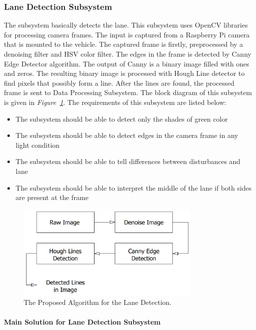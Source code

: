 \documentclass[a4paper,12pt]{article}
\begin{document}
	\subsubsection{Lane Detection Subsystem}
	The subsystem basically detects the lane. This subsystem uses OpenCV libraries for processing camera frames. The input is captured from a Raspberry Pi camera that is mounted to the vehicle. The captured frame is firstly, preprocessed by a denoising filter and HSV color filter. The edges in the frame is detected by Canny Edge Detector algorithm. The output of Canny is a binary image filled with ones and zeros. The resulting binary image is processed with Hough Line detector to find pixels that possibly form a line. After the lines are found, the processed frame is sent to Data Processing Subsystem. The block diagram of this subsystem is given in \textit{Figure~\ref{fig:lane_detection_subsystem}}. The requirements of this subsystem are listed below:
	\begin{itemize}
		\item The subsystem should be able to detect only the shades of green color
		\item The subsystem should be able to detect edges in the camera frame in any light condition
		\item The subsystem should be able to tell differences between disturbances and lane
		\item The subsystem should be able to interpret the middle of the lane if both sides are present at the frame
	\end{itemize}
	
	\begin{figure}[t]
		\center
		\setlength{\unitlength}{\textwidth} 
		\includegraphics[width=0.8\textwidth]{v-models/lane_detection_subsystem}
		\caption{\label{fig:lane_detection_subsystem}The Proposed Algorithm for the Lane Detection.}
	\end{figure}
	
	\paragraph{Main Solution for Lane Detection Subsystem}
		
\end{document}
